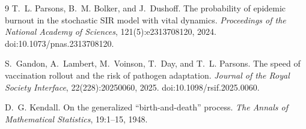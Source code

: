 \documentclass[11pt]{article}
\begin{document}
\begin{thebibliography}{9}
T.~L. Parsons, B.~M. Bolker, and J.~Dushoff.
\newblock The probability of epidemic burnout in the stochastic SIR model with vital dynamics.
\newblock \emph{Proceedings of the National Academy of Sciences}, 121(5):e2313708120, 2024.
\newblock doi:10.1073/pnas.2313708120.

S.~Gandon, A.~Lambert, M.~Voinson, T.~Day, and T.~L. Parsons.
\newblock The speed of vaccination rollout and the risk of pathogen adaptation.
\newblock \emph{Journal of the Royal Society Interface}, 22(228):20250060, 2025.
\newblock doi:10.1098/rsif.2025.0060.

D.~G. Kendall.
\newblock On the generalized ``birth-and-death'' process.
\newblock \emph{The Annals of Mathematical Statistics}, 19:1--15, 1948.
\end{thebibliography}
\end{document}
